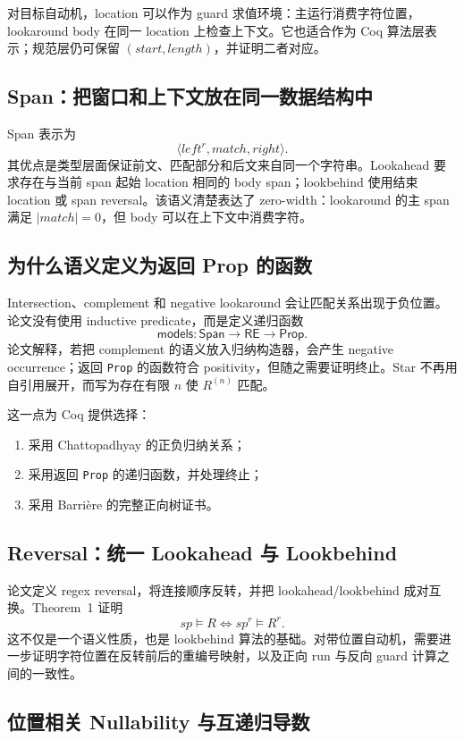 \documentclass[UTF8,a4paper,12pt]{ctexart}
\begin{document}
对目标自动机，location 可以作为 guard 求值环境：主运行消费字符位置，lookaround body 在同一 location 上检查上下文。它也适合作为 Coq 算法层表示；规范层仍可保留 $(start,length)$，并证明二者对应。

\subsection{Span：把窗口和上下文放在同一数据结构中}

Span 表示为
\[
\langle left^r,match,right\rangle.
\]
其优点是类型层面保证前文、匹配部分和后文来自同一个字符串。Lookahead 要求存在与当前 span 起始 location 相同的 body span；lookbehind 使用结束 location 或 span reversal。该语义清楚表达了 zero-width：lookaround 的主 span 满足 $|match|=0$，但 body 可以在上下文中消费字符。

\subsection{为什么语义定义为返回 Prop 的函数}

Intersection、complement 和 negative lookaround 会让匹配关系出现于负位置。论文没有使用 inductive predicate，而是定义递归函数
\[
\mathsf{models}:\mathsf{Span}\to\mathsf{RE}\to\mathsf{Prop}.
\]
论文解释，若把 complement 的语义放入归纳构造器，会产生 negative occurrence；返回 \texttt{Prop} 的函数符合 positivity，但随之需要证明终止\cite[pp.~4--5]{zhuchko2024}。Star 不再用自引用展开，而写为存在有限 $n$ 使 $R^{(n)}$ 匹配。

这一点为 Coq 提供选择：
\begin{enumerate}
  \item 采用 Chattopadhyay 的正负归纳关系；
  \item 采用返回 \texttt{Prop} 的递归函数，并处理终止；
  \item 采用 Barri\`ere 的完整正向树证书。
\end{enumerate}

\subsection{Reversal：统一 Lookahead 与 Lookbehind}

论文定义 regex reversal，将连接顺序反转，并把 lookahead/lookbehind 成对互换。Theorem~1 证明
\[
sp\models R\iff sp^r\models R^r.
\]
这不仅是一个语义性质，也是 lookbehind 算法的基础。对带位置自动机，需要进一步证明字符位置在反转前后的重编号映射，以及正向 run 与反向 guard 计算之间的一致性。

\subsection{位置相关 Nullability 与互递归导数}
\end{document}
